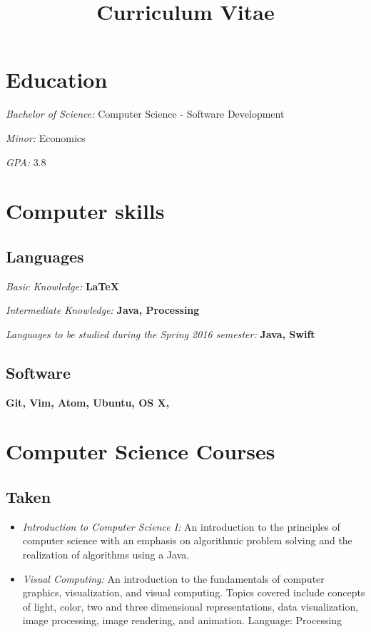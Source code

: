 \documentclass[11pt,a4paper,sans]{moderncv} %
\title{Curriculum Vitae}
\begin{document}
\makecvtitle %

\section{Education}

{\textit{Bachelor of Science: }{Computer Science - Software Development}}

{\textit{Minor: }{Economics}

{\textit{GPA: }{3.8}

\section{Computer skills}

\subsection{Languages}
{\textit{Basic Knowledge: }{\textbf{LaTeX}}}

{\textit{Intermediate Knowledge: }{\textbf{Java, Processing}}}

{\textit{Languages to be studied during the Spring 2016 semester: }{\textbf{Java, Swift}}}

\subsection{Software}
{\textbf{Git, Vim, Atom, Ubuntu, OS X,}}

\section{Computer Science Courses}

\subsection{Taken}
\begin{itemize}
\item {\textit{Introduction to Computer Science I: }{An introduction to the principles of computer science with an emphasis on algorithmic problem solving and the realization of algorithms using a Java.}}
\item{\textit{Visual Computing: }{An introduction to the fundamentals of computer graphics, visualization, and visual computing. Topics covered include concepts of light, color, two and three dimensional representations, data visualization, image processing, image rendering, and animation. Language: Processing}}
\end{itemize}
}}
\end{document}
